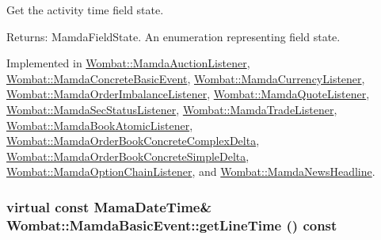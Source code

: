 Get the activity time field state. 

\begin{Desc}
\item[Returns:]Mamda\-Field\-State. An enumeration representing field state. \end{Desc}


Implemented in \hyperlink{classWombat_1_1MamdaAuctionListener_f45aaa5aebbae7e326da900ea11c8422}{Wombat::Mamda\-Auction\-Listener}, \hyperlink{classWombat_1_1MamdaConcreteBasicEvent_d2ffaf16878c95e6740e7b3f77f1bb4e}{Wombat::Mamda\-Concrete\-Basic\-Event}, \hyperlink{classWombat_1_1MamdaCurrencyListener_7ad1cdb959dcb619780b27383704d157}{Wombat::Mamda\-Currency\-Listener}, \hyperlink{classWombat_1_1MamdaOrderImbalanceListener_e01441cb3be1b7466ece277699971fa3}{Wombat::Mamda\-Order\-Imbalance\-Listener}, \hyperlink{classWombat_1_1MamdaQuoteListener_79f601394c430d4883bcb41f0b470b29}{Wombat::Mamda\-Quote\-Listener}, \hyperlink{classWombat_1_1MamdaSecStatusListener_5c7ee86111027d782bc1477700a78224}{Wombat::Mamda\-Sec\-Status\-Listener}, \hyperlink{classWombat_1_1MamdaTradeListener_a43ecdb29f836cb0176ca473515de915}{Wombat::Mamda\-Trade\-Listener}, \hyperlink{classWombat_1_1MamdaBookAtomicListener_9910ae16b92a548bce1821ed98de8956}{Wombat::Mamda\-Book\-Atomic\-Listener}, \hyperlink{classWombat_1_1MamdaOrderBookConcreteComplexDelta_907b71fab386608f4eb1e3de60b15b72}{Wombat::Mamda\-Order\-Book\-Concrete\-Complex\-Delta}, \hyperlink{classWombat_1_1MamdaOrderBookConcreteSimpleDelta_7860a6d80ad23193276b19faef6db47f}{Wombat::Mamda\-Order\-Book\-Concrete\-Simple\-Delta}, \hyperlink{classWombat_1_1MamdaOptionChainListener_2d0bea759653d2e73734d2fbfd01574a}{Wombat::Mamda\-Option\-Chain\-Listener}, and \hyperlink{classWombat_1_1MamdaNewsHeadline_87fdd5a28a8eb589ea70b255455df57f}{Wombat::Mamda\-News\-Headline}.\hypertarget{classWombat_1_1MamdaBasicEvent_3fcc26fa1a6446bcec12b11ac74ed26d}{
\subsubsection[getLineTime]{\setlength{\rightskip}{0pt plus 5cm}virtual const Mama\-Date\-Time\& Wombat::Mamda\-Basic\-Event::get\-Line\-Time () const}}
\label{classWombat_1_1MamdaBasicEvent_3fcc26fa1a6446bcec12b11ac74ed26d}


